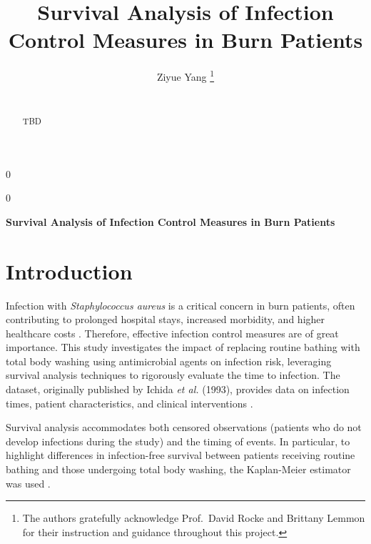 \documentclass[12pt]{article}
\newcommand{\blind}{0}
\begin{document}
\def\spacingset#1{\renewcommand{\baselinestretch}%
{#1}\small\normalsize} \spacingset{1}



\blind
{
  \title{\bf Survival Analysis of Infection Control Measures in Burn
Patients}

  \author{
        Ziyue Yang \thanks{The authors gratefully acknowledge
Prof.~David Rocke and Brittany Lemmon for their instruction and guidance
throughout this project.} \\
    \\
      }
  \maketitle
} \fi

\blind
{
  \bigskip
  \bigskip
  \bigskip
  \begin{center}
    {\LARGE\bf Survival Analysis of Infection Control Measures in Burn
Patients}
  \end{center}
  \medskip
} \fi

\bigskip
\begin{abstract}
TBD
\end{abstract}

\noindent%
 

\vfill

\newpage
\spacingset{1.9} %

\section{Introduction}\label{introduction}

Infection with \emph{Staphylococcus aureus} is a critical concern in
burn patients, often contributing to prolonged hospital stays, increased
morbidity, and higher healthcare costs \citep{norbury_infection_2016}.
Therefore, effective infection control measures are of great importance.
This study investigates the impact of replacing routine bathing with
total body washing using antimicrobial agents on infection risk,
leveraging survival analysis techniques to rigorously evaluate the time
to infection. The dataset, originally published by Ichida \emph{et al.}
(1993), provides data on infection times, patient characteristics, and
clinical interventions \citep{ichida_evaluation_1993}.

Survival analysis accommodates both censored observations (patients who
do not develop infections during the study) and the timing of events. In
particular, to highlight differences in infection-free survival between
patients receiving routine bathing and those undergoing total body
washing, the Kaplan-Meier estimator was used
\citep{kaplan_nonparametric_1958}.
\end{document}
